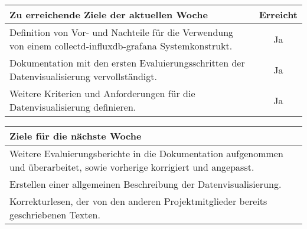 \begin{tabularx}{\textwidth}{Xc}
    \arrayrulecolor{OliveGreen}
    \toprule
    {\bfseries Zu erreichende Ziele der aktuellen Woche} & {\bfseries Erreicht} \\
    \midrule[2pt]
    Definition von Vor- und Nachteile für die Verwendung von einem
    collectd-influxdb-grafana Systemkonstrukt. &Ja              \\
    \rowcolor{OliveGreen!15}
    Dokumentation mit den ersten Evaluierungsschritten der Datenvisualisierung
    vervollständigt.                         &Ja               \\
    \rowcolor{White}
    Weitere Kriterien und Anforderungen für die Datenvisualisierung
    definieren.               &Ja               \\
    \bottomrule[2pt]
\end{tabularx}
%
\vspace{1cm}
%
\begin{tabularx}{\textwidth}{Xc}
    \arrayrulecolor{OliveGreen}
    \toprule
    {\bfseries Ziele für die nächste Woche}        &                         \\
    \midrule[2pt]
    Weitere Evaluierungsberichte in die Dokumentation aufgenommen und
    überarbeitet, sowie vorherige korrigiert und angepasst. &                    \\
    \rowcolor{OliveGreen!15}
    Erstellen einer allgemeinen Beschreibung der Datenvisualisierung.   &     \\
    \rowcolor{White}
    Korrekturlesen, der von den anderen Projektmitglieder bereits geschriebenen
    Texten. & \\
\end{tabularx}
